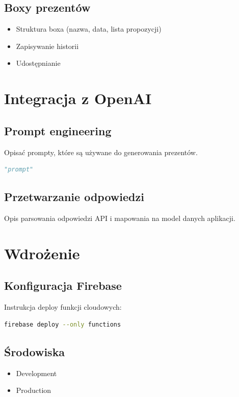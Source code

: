\documentclass[a4paper, 12pt]{article}
\begin{document}
\subsection{Boxy prezentów}
\begin{itemize}
    \item Struktura boxa (nazwa, data, lista propozycji)
    \item Zapisywanie historii
    \item Udostępnianie
\end{itemize}

\newpage
\section{Integracja z OpenAI}
\subsection{Prompt engineering}
Opisać prompty, które są używane do generowania prezentów.
\begin{lstlisting}[language=python]
"prompt"
\end{lstlisting}

\subsection{Przetwarzanie odpowiedzi}
Opis parsowania odpowiedzi API i mapowania na model danych aplikacji.

\newpage
\section{Wdrożenie}
\subsection{Konfiguracja Firebase}
Instrukcja deploy funkcji cloudowych:
\begin{lstlisting}[language=bash]
firebase deploy --only functions
\end{lstlisting}

\subsection{Środowiska}
\begin{itemize}
    \item Development
    \item Production
\end{itemize}

\newpage
\end{document}
